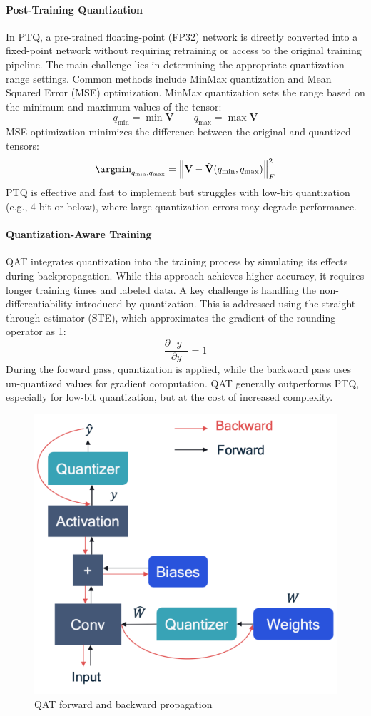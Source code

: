 \paragraph*{Post-Training Quantization}
In PTQ, a pre-trained floating-point (FP32) network is directly converted into a fixed-point network without requiring retraining or access to the original training pipeline. 
The main challenge lies in determining the appropriate quantization range settings. 
Common methods include MinMax quantization and Mean Squared Error (MSE) optimization.
MinMax quantization sets the range based on the minimum and maximum values of the tensor:
\[q_{\min}=\min\mathbf{V} \qquad q_{\max}=\max\mathbf{V}\]
MSE optimization minimizes the difference between the original and quantized tensors:
\[\argmin_{q_{\min},q_{\max}}={\left\lVert \mathbf{V}-\hat{\mathbf{V}}(q_{\min},q_{\max})\right\rVert}_F^2 \]
PTQ is effective and fast to implement but struggles with low-bit quantization (e.g., 4-bit or below), where large quantization errors may degrade performance.

\paragraph*{Quantization-Aware Training}
QAT integrates quantization into the training process by simulating its effects during backpropagation. 
While this approach achieves higher accuracy, it requires longer training times and labeled data. 
A key challenge is handling the non-differentiability introduced by quantization. 
This is addressed using the straight-through estimator (STE), which approximates the gradient of the rounding operator as 1:
\[\dfrac{\partial\left\lfloor y\right\rceil}{\partial y}=1\]
During the forward pass, quantization is applied, while the backward pass uses un-quantized values for gradient computation. 
QAT generally outperforms PTQ, especially for low-bit quantization, but at the cost of increased complexity.
\begin{figure}[H]
    \centering
    \includegraphics[width=0.75\linewidth]{images/eeai10.png}
    \caption{QAT forward and backward propagation}
\end{figure}

